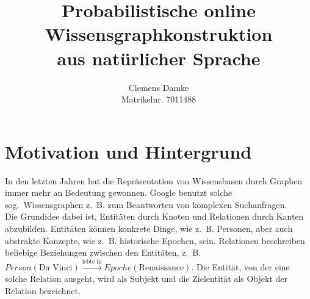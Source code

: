 \documentclass[11pt, a4paper]{scrreprt}
\begin{document}
\titlehead{Entwurf 1}
\subject{Bachelorarbeit Proposal}
\title{
	Probabilistische online\\
	Wissensgraphkonstruktion\\
	aus natürlicher Sprache
}
\author{
	Clemens Damke\\[1ex]
	Matrikelnr. 7011488
}
\publishers{
	{\normalsize betreut von}\\[2ex]
	Prof.~Dr.~Eyke Hüllermeier\\
	Intelligente Systeme\\
	Institut für Informatik\\
	Universität Paderborn
}
\maketitle

\section{Motivation und Hintergrund}

In den letzten Jahren hat die Repräsentation von Wissensbasen durch Graphen immer mehr an Bedeutung gewonnen.
Google benutzt solche sog.\ Wissensgraphen z.~B. zum Beantworten von komplexen Suchanfragen.\\

Die Grundidee dabei ist, Entitäten durch Knoten und Relationen durch Kanten abzubilden.
Entitäten können konkrete Dinge, wie z.~B. Personen, aber auch abstrakte Konzepte, wie z.~B. historische Epochen, sein.
Relationen beschreiben beliebige Beziehungen zwischen den Entitäten, z.~B. $Person(\text{Da~Vinci}) \xrightarrow{\text{lebte~in}} Epoche(\text{Renaissance})$.
Die Entität, von der eine solche Relation ausgeht, wird als Subjekt und die Zielentität als Objekt der Relation bezeichnet.\\
\end{document}
